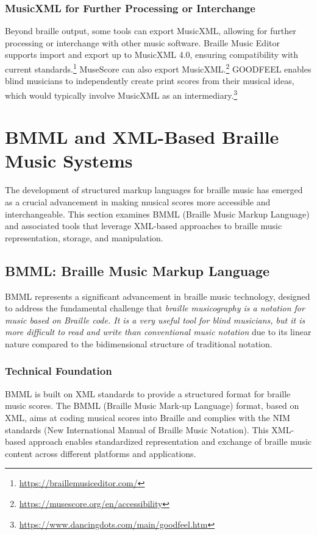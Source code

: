 \subsubsection{MusicXML for Further Processing or Interchange}
Beyond braille output, some tools can export MusicXML, allowing for further processing or interchange with other music software. Braille Music Editor supports import and export up to MusicXML 4.0, ensuring compatibility with current standards.\footnote{\url{https://braillemusiceditor.com/}} MuseScore can also export MusicXML.\footnote{\url{https://musescore.org/en/accessibility}} GOODFEEL enables blind musicians to independently create print scores from their musical ideas, which would typically involve MusicXML as an intermediary.\footnote{\url{https://www.dancingdots.com/main/goodfeel.htm}}

\section{BMML and XML-Based Braille Music Systems}

The development of structured markup languages for braille music has emerged as a crucial advancement in making musical scores more accessible and interchangeable. This section examines BMML (Braille Music Markup Language) and associated tools that leverage XML-based approaches to braille music representation, storage, and manipulation.

\subsection{BMML: Braille Music Markup Language}

BMML represents a significant advancement in braille music technology, designed to address the fundamental challenge that \textit{braille musicography is a notation for music based on Braille code. It is a very useful tool for blind musicians, but it is more difficult to read and write than conventional music notation} due to its linear nature compared to the bidimensional structure of traditional notation.

\subsubsection{Technical Foundation}
BMML is built on XML standards to provide a structured format for braille music scores. The BMML (Braille Music Mark-up Language) format, based on XML, aims at coding musical scores into Braille and complies with the NIM standards (New International Manual of Braille Music Notation). This XML-based approach enables standardized representation and exchange of braille music content across different platforms and applications.

